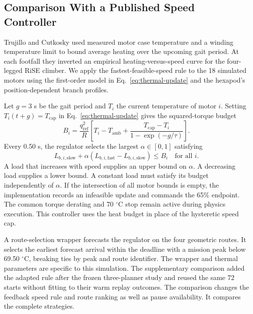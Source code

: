 \documentclass{ieeeaccess}
\begin{document}
\subsection{Comparison With a Published Speed Controller}

Trujillo and Cutkosky \cite[Sec.~III-D, Eq.~(8)]{trujillo2009} used measured motor case temperature and a winding temperature limit to bound average heating over the upcoming gait period. At each footfall they inverted an empirical heating-versus-speed curve for the four-legged RiSE climber. We apply the fastest-feasible-speed rule to the 18 simulated motors using the first-order model in Eq.~\eqref{eq:thermal-update} and the hexapod's position-dependent branch profiles.

Let $g=3$ s be the gait period and $T_i$ the current temperature of motor $i$. Setting $T_i(t+g)=T_{\mathrm{cap}}$ in Eq.~\eqref{eq:thermal-update} gives the squared-torque budget
\begin{equation}
B_i = \frac{q_{\mathrm{ref}}^2}{R}
    \left[T_i-T_{\mathrm{amb}}
      +\frac{T_{\mathrm{cap}}-T_i}{1-\exp(-g/\tau)}\right].
\label{eq:squared-torque-budget}
\end{equation}
Every 0.50 s, the regulator selects the largest $\alpha\in[0,1]$ satisfying
\begin{equation}
L_{b,i,\mathrm{slow}}+\alpha
  (L_{b,i,\mathrm{fast}}-L_{b,i,\mathrm{slow}})\leq B_i
  \quad\text{for all }i .
\label{eq:speed-constraints}
\end{equation}
A load that increases with speed supplies an upper bound on $\alpha$. A decreasing load supplies a lower bound. A constant load must satisfy its budget independently of $\alpha$. If the intersection of all motor bounds is empty, the implementation records an infeasible update and commands the 65\% endpoint. The common torque derating and 70 \ensuremath{{}^{\circ}\mathrm{C}} stop remain active during physics execution. This controller uses the heat budget in place of the hysteretic speed cap.

A route-selection wrapper forecasts the regulator on the four geometric routes. It selects the earliest forecast arrival within the deadline with a mission peak below 69.50 \ensuremath{{}^{\circ}\mathrm{C}}, breaking ties by peak and route identifier. The wrapper and thermal parameters are specific to this simulation. The supplementary comparison added the adapted rule after the frozen three-planner study and reused the same 72 starts without fitting to their warm replay outcomes. The comparison changes the feedback speed rule and route ranking as well as pause availability. It compares the complete strategies.
\end{document}
